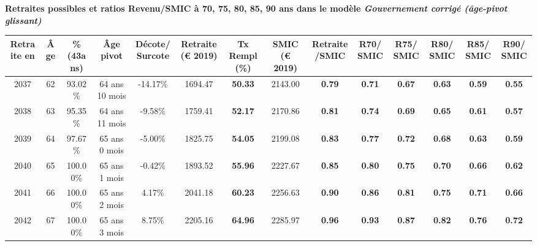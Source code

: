  \vspace{0.1cm} 
{\bf \noindent Retraites possibles et ratios Revenu/SMIC à 70, 75, 80, 85, 90 ans dans le modèle \emph{Gouvernement corrigé (âge-pivot glissant)}}  
 
\begin{adjustbox}{max width=\textwidth} 
\begin{tabular}[htb]{|c|c||c|c|c||c|c||c|c||c|c|c|c|c|} 
\hline 
 Retraite en &  Âge &  \%(43ans) &  Âge pivot &  Décote/Surcote &  Retraite (\euro{} 2019) &  Tx Rempl(\%) &  SMIC (\euro{} 2019) &  Retraite/SMIC &  R70/SMIC &  R75/SMIC &  R80/SMIC &  R85/SMIC &  R90/SMIC \\ 
\hline \hline 
 2037 &  62 &  93.02\% &  64 ans 10 mois &  -14.17\% &  1694.47 &  {\bf 50.33} &  2143.00 &  {\bf {\color{red} 0.79}} &  {\bf {\color{red} 0.71}} &  {\bf {\color{red} 0.67}} &  {\bf {\color{red} 0.63}} &  {\bf {\color{red} 0.59}} &  {\bf {\color{red} 0.55}} \\ 
\hline 
 2038 &  63 &  95.35\% &  64 ans 11 mois &  -9.58\% &  1759.41 &  {\bf 52.17} &  2170.86 &  {\bf {\color{red} 0.81}} &  {\bf {\color{red} 0.74}} &  {\bf {\color{red} 0.69}} &  {\bf {\color{red} 0.65}} &  {\bf {\color{red} 0.61}} &  {\bf {\color{red} 0.57}} \\ 
\hline 
 2039 &  64 &  97.67\% &  65 ans 0 mois &  -5.00\% &  1825.75 &  {\bf 54.05} &  2199.08 &  {\bf {\color{red} 0.83}} &  {\bf {\color{red} 0.77}} &  {\bf {\color{red} 0.72}} &  {\bf {\color{red} 0.68}} &  {\bf {\color{red} 0.63}} &  {\bf {\color{red} 0.59}} \\ 
\hline 
 2040 &  65 &  100.00\% &  65 ans 1 mois &  -0.42\% &  1893.52 &  {\bf 55.96} &  2227.67 &  {\bf {\color{red} 0.85}} &  {\bf {\color{red} 0.80}} &  {\bf {\color{red} 0.75}} &  {\bf {\color{red} 0.70}} &  {\bf {\color{red} 0.66}} &  {\bf {\color{red} 0.62}} \\ 
\hline 
 2041 &  66 &  100.00\% &  65 ans 2 mois &  4.17\% &  2041.18 &  {\bf 60.23} &  2256.63 &  {\bf {\color{red} 0.90}} &  {\bf {\color{red} 0.86}} &  {\bf {\color{red} 0.81}} &  {\bf {\color{red} 0.75}} &  {\bf {\color{red} 0.71}} &  {\bf {\color{red} 0.66}} \\ 
\hline 
 2042 &  67 &  100.00\% &  65 ans 3 mois &  8.75\% &  2205.16 &  {\bf 64.96} &  2285.97 &  {\bf {\color{red} 0.96}} &  {\bf {\color{red} 0.93}} &  {\bf {\color{red} 0.87}} &  {\bf {\color{red} 0.82}} &  {\bf {\color{red} 0.76}} &  {\bf {\color{red} 0.72}} \\ 
\hline 
\hline 
\end{tabular} 
\end{adjustbox} 
 
